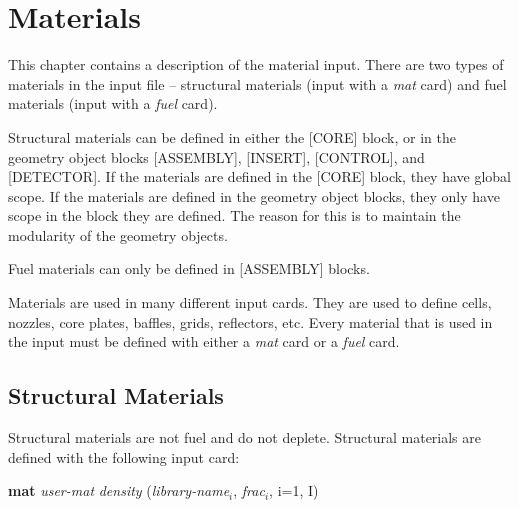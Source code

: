 %
%
\chapter{Materials}  \label{chap:materials}

This chapter contains a description of the material input.  There are two types of materials
in the input file -- structural materials (input with a {\it mat} card) and fuel materials
(input with a {\it fuel} card).

Structural materials can be defined in either the [CORE] block, or in the
geometry object blocks [ASSEMBLY], [INSERT], [CONTROL], and [DETECTOR].
If the materials are defined in the [CORE] block, they have global scope.
If the materials are defined in the geometry object blocks, they only have
scope in the block they are defined.
The reason for this is to maintain the modularity of the geometry objects.

Fuel materials can only be defined in [ASSEMBLY] blocks.

Materials are used in many different input cards.  They are used to define
cells, nozzles, core plates, baffles, grids, reflectors, etc.  Every material that
is used in the input must be defined with either a {\it mat} card or a {\it fuel} card.

\section{Structural Materials}

Structural materials are not fuel and do not deplete.  Structural
materials are defined with the following input card:

{\bf mat} {\it user-mat} {\it density} ({\it library-name$_i$}, {\it frac$_i$}, i=1, I)

